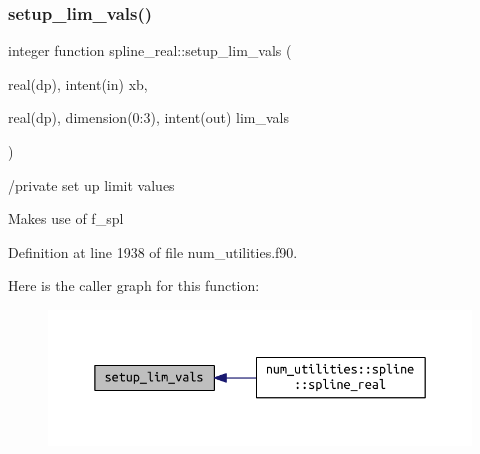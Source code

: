 \subsubsection{\texorpdfstring{setup\+\_\+lim\+\_\+vals()}{setup\_lim\_vals()}}
{\footnotesize\ttfamily integer function spline\+\_\+real\+::setup\+\_\+lim\+\_\+vals (\begin{DoxyParamCaption}\item[{real(dp), intent(in)}]{xb,  }\item[{real(dp), dimension(0\+:3), intent(out)}]{lim\+\_\+vals }\end{DoxyParamCaption})}



/private set up limit values 

Makes use of f\+\_\+spl 

Definition at line 1938 of file num\+\_\+utilities.\+f90.

Here is the caller graph for this function\+:\nopagebreak
\begin{figure}[H]
\begin{center}
\leavevmode
\includegraphics[width=350pt]{num__utilities_8f90_a41f0ec23e08348e7498587997f483a00_icgraph}
\end{center}
\end{figure}
